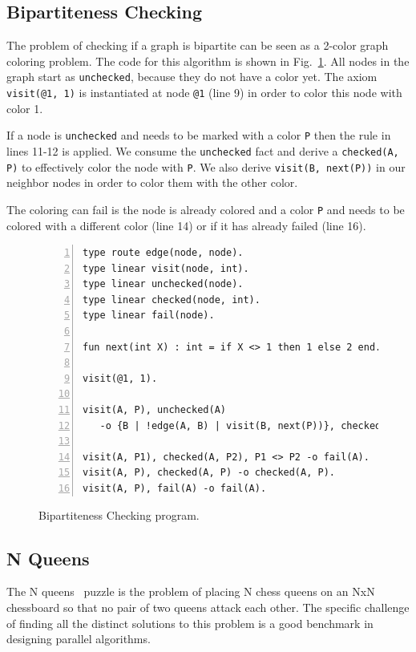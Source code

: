 \subsection{Bipartiteness Checking}

The problem of checking if a graph is bipartite can be seen as a 2-color graph coloring problem.
The code for this algorithm is shown in Fig.~\ref{code:bichecking}. All nodes in the graph
start as \texttt{unchecked}, because they do not have a color yet. The axiom \texttt{visit(@1, 1)} is
instantiated at node \texttt{@1} (line 9) in order to color this node with color 1.

If a node is \texttt{unchecked} and needs to be marked with a color \texttt{P} then the rule in
lines 11-12 is applied. We consume the \texttt{unchecked} fact and derive a \texttt{checked(A, P)}
to effectively color the node with \texttt{P}. We also derive \texttt{visit(B, next(P))} in
our neighbor nodes in order to color them with the other color.

The coloring can fail is the node is already colored and a color \texttt{P} and needs to be colored
with a different color (line 14) or if it has already failed (line 16).

\begin{figure}[h!]
\small\begin{Verbatim}[numbers=left]
type route edge(node, node).
type linear visit(node, int).
type linear unchecked(node).
type linear checked(node, int).
type linear fail(node).

fun next(int X) : int = if X <> 1 then 1 else 2 end.

visit(@1, 1).

visit(A, P), unchecked(A)
   -o {B | !edge(A, B) | visit(B, next(P))}, checked(A, P).

visit(A, P1), checked(A, P2), P1 <> P2 -o fail(A).
visit(A, P), checked(A, P) -o checked(A, P).
visit(A, P), fail(A) -o fail(A).
\end{Verbatim}
  \caption{Bipartiteness Checking program.}
  \label{code:bichecking}
\end{figure}
\normalsize

\subsection{N Queens}


The N queens~\cite{8queens} puzzle is the problem of placing N chess queens on an NxN chessboard so
that no pair of two queens attack each other. The specific challenge of finding all the distinct
solutions to this problem is a good benchmark in designing parallel algorithms.


